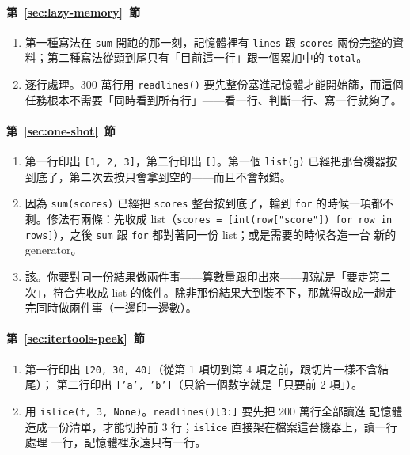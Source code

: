 \paragraph{第~\ref{sec:lazy-memory}~節}
\begin{enumerate}
\item 第一種寫法在 \texttt{sum} 開跑的那一刻，記憶體裡有 \texttt{lines} 跟
\texttt{scores} 兩份完整的資料；第二種寫法從頭到尾只有「目前這一行」跟一個累加中的
\texttt{total}。
\item 逐行處理。300 萬行用 \texttt{readlines()} 要先整份塞進記憶體才能開始篩，而這個
任務根本不需要「同時看到所有行」——看一行、判斷一行、寫一行就夠了。
\end{enumerate}

\paragraph{第~\ref{sec:one-shot}~節}
\begin{enumerate}
\item 第一行印出 \texttt{[1, 2, 3]}，第二行印出 \texttt{[]}。第一個 \texttt{list(g)}
已經把那台機器按到底了，第二次去按只會拿到空的——而且不會報錯。
\item 因為 \texttt{sum(scores)} 已經把 \texttt{scores} 整台按到底了，輪到 \texttt{for}
的時候一項都不剩。修法有兩條：先收成 list（\texttt{scores = [int(row["score"]) for row
in rows]}），之後 \texttt{sum} 跟 \texttt{for} 都對著同一份 list；或是需要的時候各造一台
新的 generator。
\item 該。你要對同一份結果做兩件事——算數量跟印出來——那就是「要走第二次」，符合先收成
list 的條件。除非那份結果大到裝不下，那就得改成一趟走完同時做兩件事（一邊印一邊數）。
\end{enumerate}

\paragraph{第~\ref{sec:itertools-peek}~節}
\begin{enumerate}
\item 第一行印出 \texttt{[20, 30, 40]}（從第 1 項切到第 4 項之前，跟切片一樣不含結尾）；
第二行印出 \texttt{['a', 'b']}（只給一個數字就是「只要前 2 項」）。
\item 用 \texttt{islice(f, 3, None)}。\texttt{readlines()[3:]} 要先把 200 萬行全部讀進
記憶體造成一份清單，才能切掉前 3 行；\texttt{islice} 直接架在檔案這台機器上，讀一行處理
一行，記憶體裡永遠只有一行。
\end{enumerate}
